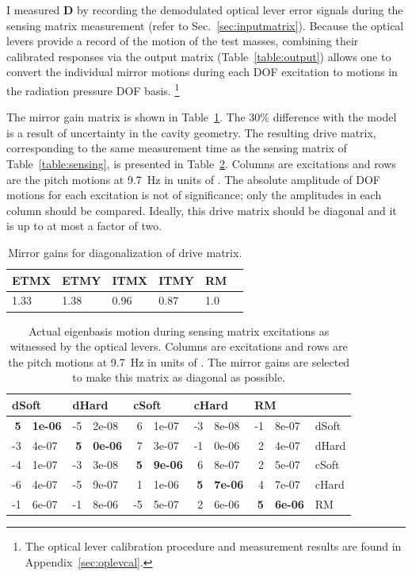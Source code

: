 I measured $\mathbf{D}$ by recording the demodulated optical lever
error signals during the sensing matrix measurement (refer to
Sec.~\ref{sec:inputmatrix}). Because the optical levers provide a
record of the motion of the test masses, combining their calibrated
responses via the output matrix (Table~\ref{table:output}) allows one
to convert the individual mirror motions during each DOF excitation to
motions in the radiation pressure DOF basis. \footnote{The optical
  lever calibration procedure and measurement results are found in
  Appendix~\ref{sec:oplevcal}.}

The mirror gain matrix is shown in Table~\ref{table:mirrorgains}. The
30\% difference with the model is a result of uncertainty in the
cavity geometry. The resulting drive matrix, corresponding to the same
measurement time as the sensing matrix of Table~\ref{table:sensing},
is presented in Table~\ref{table:excitations_calibrated}. Columns are
excitations and rows are the pitch motions at 9.7~Hz in units of
\microrad. The absolute amplitude of DOF motions for each excitation
is not of significance; only the amplitudes in each column should be
compared. Ideally, this drive matrix should be diagonal and it is up
to at most a factor of two.

\begin{table}
\centering
\caption[Mirror gains for diagonalization of drive matrix]{Mirror
  gains for diagonalization of drive matrix.} 
\begin{tabular}{l l l l l l}
\hline
ETMX & ETMY & ITMX & ITMY & RM & \\
\hline
1.33 & 1.38 & 0.96 & 0.87 & 1.0 \\
\hline
\end{tabular}
\label{table:mirrorgains}
\end{table}

\begin{table}
\centering
\caption[Actual eigenbasis motion during sensing matrix
excitations]{Actual eigenbasis motion during sensing matrix
  excitations as witnessed by the optical levers. Columns are
  excitations and rows are the pitch motions at 9.7~Hz in units of
  \microrad. The mirror gains are selected to make this matrix as
  diagonal as possible.} 
\begin{tabular}{r@{.}l r@{.}l r@{.}l r@{.}l r@{.}l l}
\hline
\multicolumn{2}{l}{dSoft} & \multicolumn{2}{l}{dHard}  & \multicolumn{2}{l}{cSoft} & \multicolumn{2}{l}{cHard} & \multicolumn{2}{l}{RM} & \\
\hline
   \textbf{5}&\textbf{1e-06} & -5&2e-08  & 6&1e-07 & -3&8e-08 &  -1&8e-07 & dSoft\\
  -3&4e-07 &  \textbf{5}&\textbf{0e-06}  &  7&3e-07 & -1&0e-06 &  2&4e-07 & dHard\\
  -4&1e-07 & -3&3e-08 &  \textbf{5}&\textbf{9e-06} &  6&8e-07 &  2&5e-07 & cSoft\\
  -6&4e-07 & -5&9e-07 &  1&1e-06 &  \textbf{5}&\textbf{7e-06} &  4&7e-07 & cHard\\
  -1&6e-07 & -1&8e-06 & -5&5e-07 &   2&6e-06 &  \textbf{5}&\textbf{6e-06} & RM\\
\hline
\end{tabular}
\label{table:excitations_calibrated}
\end{table}


